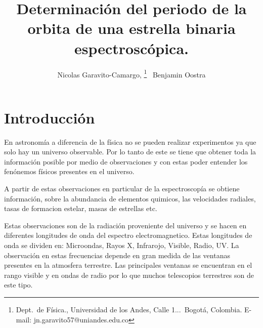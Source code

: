 \documentclass[Proceedings]{ascelike}
\begin{document}
%
\title{Determinaci\'on del periodo de la orbita de una estrella binaria espectrosc\'opica.}
%
\author{
Nicolas Garavito-Camargo,%
%
\thanks{
Dept.\ de F\'isica.,
Universidad de los Andes, 
Calle 1...\ Bogot\'a, Colombia. E-mail: jn.garavito57@uniandes.edu.co}
\ Benjamin Oostra\footnotemark[1]
%
%
%
%
%
%
}
%
\maketitle
%

\section*{Introducci\'on}

En astronom\'ia a diferencia de la f\'isica no se pueden realizar experimentos ya
que solo hay un universo observable. Por lo tanto de este se tiene que obtener 
toda la informaci\'on posible por medio de observaciones y con estas poder entender 
los fen\'onemos f\'isicos presentes en el universo.

A partir de estas observaciones en particular de la espectroscop\'ia se obtiene informaci\'on,
sobre la abundancia de elementos quimicos, las velocidades radiales, tasas de formacion estelar, 
masas de estrellas etc.

Estas observaciones son de la radiaci\'on proveniente del universo y se hacen
 en diferentes longitudes de onda del espectro electromagnetico. Estas longitudes 
 de onda se dividen en: Microondas, Rayos X, Infrarojo, Visible, Radio, UV. La observaci\'on 
 en estas frecuencias depende en gran medida de las ventanas presentes en la atmosfera terrestre.
Las principales ventanas se encuentran en el rango visible y en ondas de radio por lo que muchos telescopios terrestres son de este tipo. 
\end{document}
